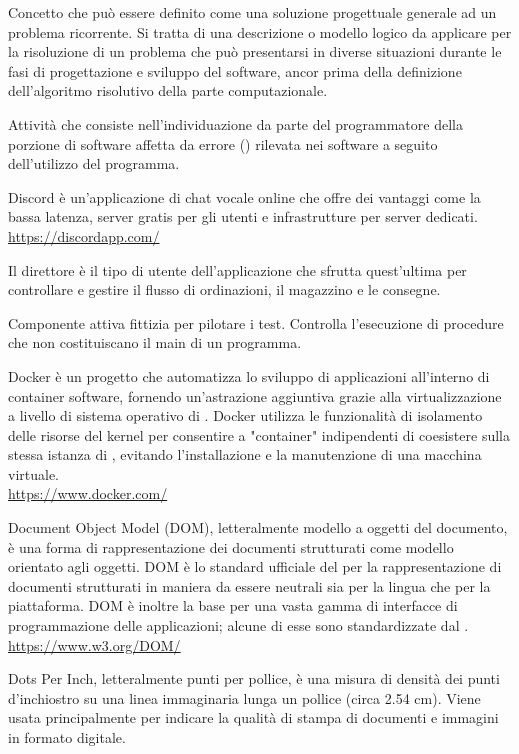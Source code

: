 Concetto che può essere definito come una soluzione progettuale generale ad un problema ricorrente. Si tratta di una descrizione o modello logico da applicare per la risoluzione di un problema che può presentarsi in diverse situazioni durante le fasi di progettazione e sviluppo del software, ancor prima della definizione dell'algoritmo risolutivo della parte computazionale.

Attività che consiste nell'individuazione da parte del programmatore della porzione di software affetta da errore () rilevata nei software a seguito dell'utilizzo del programma.

Discord è un’applicazione di chat vocale online che offre dei vantaggi come la bassa latenza, server gratis per gli utenti e infrastrutture per server dedicati.\\
\url{https://discordapp.com/}

Il direttore è il tipo di utente dell’applicazione che sfrutta quest’ultima per controllare e gestire il flusso di ordinazioni, il magazzino e le consegne.

Componente attiva fittizia per pilotare i test. Controlla l’esecuzione di procedure che non costituiscano il main di un programma.

Docker è un progetto  che automatizza lo sviluppo di applicazioni all'interno di container software, fornendo un'astrazione aggiuntiva grazie alla virtualizzazione a livello di sistema operativo di . Docker utilizza le funzionalità di isolamento delle risorse del kernel  per consentire a "container" indipendenti di coesistere sulla stessa istanza di , evitando l'installazione e la manutenzione di una macchina virtuale.\\
\url{https://www.docker.com/}

Document Object Model (DOM), letteralmente modello a oggetti del documento, è una forma di rappresentazione dei documenti strutturati come modello orientato agli oggetti.
DOM è lo standard ufficiale del  per la rappresentazione di documenti strutturati in maniera da essere neutrali sia per la lingua che per la piattaforma. DOM è inoltre la base per una vasta gamma di interfacce di programmazione delle applicazioni; alcune di esse sono standardizzate dal .\\
\url{https://www.w3.org/DOM/}

Dots Per Inch, letteralmente punti per pollice, è una misura di densità dei punti d'inchiostro su una linea immaginaria lunga un pollice (circa 2.54 cm). Viene usata principalmente per indicare la qualità di stampa di documenti e immagini in formato digitale.
\clearpage
